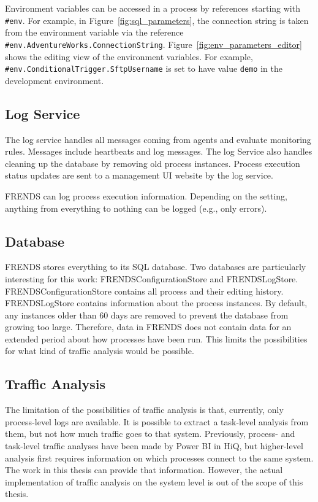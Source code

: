 \documentclass[english, 12pt, a4paper, sci, utf8, a-2b, online, obeyspaces]{aaltothesis}
\begin{document}
Environment variables can be accessed in a process by references starting with \verb|#env|. For example, in Figure~\ref{fig:sql_parameters}, the connection string is taken from the environment variable via the reference \verb|#env.AdventureWorks.ConnectionString|. Figure~\ref{fig:env_parameters_editor} shows the editing view of the environment variables. For example, \linebreak \verb|#env.ConditionalTrigger.SftpUsername| is set to have value \verb|demo| in the development environment.


\subsection{Log Service}
The log service handles all messages coming from agents and evaluate monitoring rules. Messages include heartbeats and log messages. The log Service also handles cleaning up the database by removing old process instances. Process execution status updates are sent to a management UI website by the log service.

FRENDS can log process execution information. Depending on the setting, anything from everything to nothing can be logged (e.g., only errors).

\subsection{Database}
FRENDS stores everything to its SQL database. Two databases are particularly interesting for this work: FRENDSConfigurationStore and FRENDSLogStore. \linebreak FRENDSConfigurationStore contains all process and their editing history. \linebreak FRENDSLogStore contains information about the process instances. By default, any instances older than 60 days are removed to prevent the database from growing too large. Therefore, data in FRENDS does not contain data for an extended period about how processes have been run. This limits the possibilities for what kind of traffic analysis would be possible.

\subsection{Traffic Analysis}
\label{sec:traffic_analysis}
The limitation of the possibilities of traffic analysis is that, currently, only process-level logs are available. It is possible to extract a task-level analysis from them, but not how much traffic goes to that system. Previously, process- and task-level traffic analyses have been made by Power BI in HiQ, but higher-level analysis first requires information on which processes connect to the same system. The work in this thesis can provide that information. However, the actual implementation of traffic analysis on the system level is out of the scope of this thesis.
\end{document}
